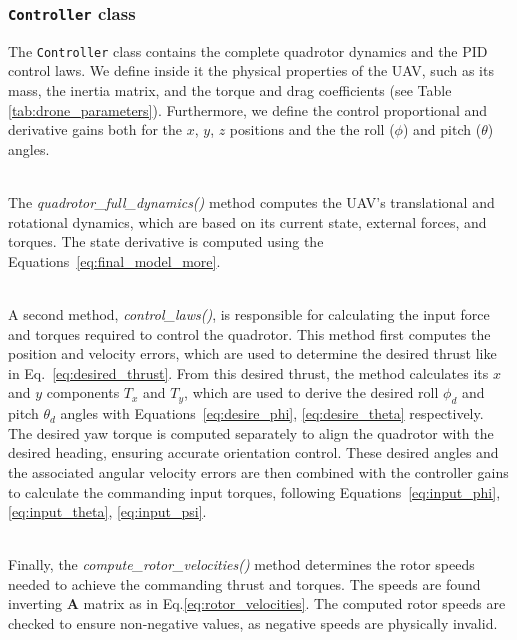 \documentclass[main]{subfiles}
\begin{document}
\subsubsection{\texttt{Controller} class}
\label{sec:controller_class}
The \texttt{Controller} class contains the 
complete quadrotor dynamics and the PID control laws. 
We define inside it the physical properties of the UAV, such as its mass, 
the inertia matrix, and the torque and drag coefficients (see Table \ref{tab:drone_parameters}).
Furthermore, we define the control proportional and derivative 
gains both for the $x$, $y$, $z$ positions and the 
the roll (\(\phi\)) and pitch (\(\theta\)) angles.

\noindent\\
The \textit{quadrotor\_full\_dynamics()} method computes 
the UAV's translational and rotational dynamics, which are based on 
its current state, external forces, and torques. 
The state derivative is computed using the Equations~\ref{eq:final_model_more}.

\noindent\\
A second method, \textit{control\_laws()}, is responsible 
for calculating the input force and torques required 
to control the quadrotor. This method first computes 
the position and velocity errors, which are used to 
determine the desired thrust like in Eq.~\ref{eq:desired_thrust}. 
From this desired thrust, the method calculates its 
$x$ and $y$ components \(T_x\) and \(T_y\), 
which are used to derive the desired roll \(\phi_d\) 
and pitch \(\theta_d\) angles with Equations~\ref{eq:desire_phi}, 
\ref{eq:desire_theta} respectively. 
The desired yaw torque is computed separately 
to align the quadrotor with the desired heading, 
ensuring accurate orientation control. These desired angles and the 
associated angular velocity errors are then combined 
with the controller gains to calculate the commanding input torques,
following Equations~\ref{eq:input_phi}, \ref{eq:input_theta}, 
\ref{eq:input_psi}. 

\noindent\\
Finally, the \textit{compute\_rotor\_velocities()} 
method determines the rotor speeds needed to achieve 
the commanding thrust and torques. The speeds are found 
inverting $\mathbf{A}$ matrix as in Eq.\ref{eq:rotor_velocities}.
The computed rotor speeds are checked 
to ensure non-negative values, as negative speeds are 
physically invalid.
\end{document}

